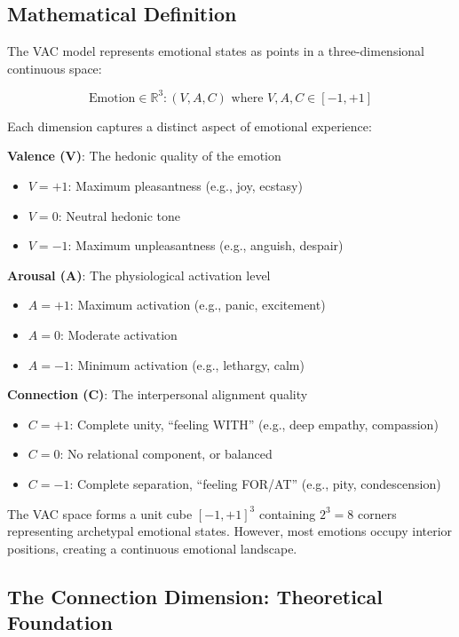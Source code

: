 \subsection{Mathematical Definition}

The VAC model represents emotional states as points in a three-dimensional continuous space:

$$\text{Emotion} \in \mathbb{R}^3: (V, A, C) \text{ where } V, A, C \in [-1, +1]$$

Each dimension captures a distinct aspect of emotional experience:

\textbf{Valence (V)}: The hedonic quality of the emotion
\begin{itemize}
    \item $V = +1$: Maximum pleasantness (e.g., joy, ecstasy)
    \item $V = 0$: Neutral hedonic tone
    \item $V = -1$: Maximum unpleasantness (e.g., anguish, despair)
\end{itemize}

\textbf{Arousal (A)}: The physiological activation level
\begin{itemize}
    \item $A = +1$: Maximum activation (e.g., panic, excitement)
    \item $A = 0$: Moderate activation
    \item $A = -1$: Minimum activation (e.g., lethargy, calm)
\end{itemize}

\textbf{Connection (C)}: The interpersonal alignment quality
\begin{itemize}
    \item $C = +1$: Complete unity, ``feeling WITH'' (e.g., deep empathy, compassion)
    \item $C = 0$: No relational component, or balanced
    \item $C = -1$: Complete separation, ``feeling FOR/AT'' (e.g., pity, condescension)
\end{itemize}

The VAC space forms a unit cube $[-1, +1]^3$ containing $2^3 = 8$ corners representing archetypal emotional states. However, most emotions occupy interior positions, creating a continuous emotional landscape.

\subsection{The Connection Dimension: Theoretical Foundation}

